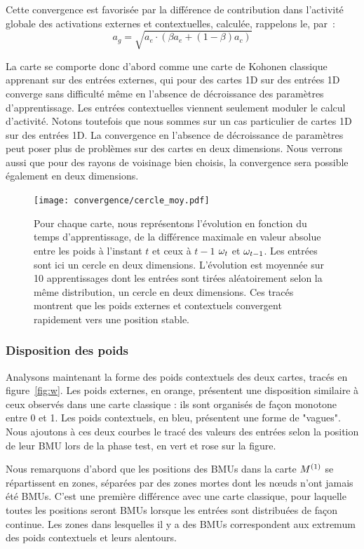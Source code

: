 \documentclass[../main]{subfiles}
\begin{document}
Cette convergence est favorisée par la différence de contribution dans l'activité globale des activations externes et contextuelles, calculée, rappelons le, par~: 
$$ a_g = \sqrt{a_e \cdot (\beta a_e + (1-\beta)a_c)}$$

La carte se comporte donc d'abord comme une carte de Kohonen classique apprenant sur des entrées externes, qui pour des cartes 1D sur des entrées 1D converge sans difficulté même en l'absence de décroissance des paramètres d'apprentissage. 
Les entrées contextuelles viennent seulement moduler le calcul d'activité.
Notons toutefois que nous sommes sur un cas particulier de cartes 1D sur des entrées 1D.
La convergence en l'absence de décroissance de paramètres peut poser plus de problèmes sur des cartes en deux dimensions. 
Nous verrons aussi que pour des rayons de voisinage bien choisis, la convergence sera possible également en deux dimensions.

\begin{figure}
	\texttt{[image: convergence/cercle\_moy.pdf]}
	\caption{Pour chaque carte, nous représentons l'évolution en fonction du temps d'apprentissage, de la différence maximale en valeur absolue entre les poids à l'instant $t$ et ceux à $t-1$ $\omega_t$ et $\omega_{t-1}$. Les entrées sont ici un cercle en deux dimensions. L'évolution est moyennée sur 10 apprentissages dont les entrées sont tirées aléatoirement selon la même distribution, un cercle en deux dimensions.
	Ces tracés montrent que les poids externes et contextuels convergent rapidement vers une position stable.\label{fig:conv}}
\end{figure}


\subsubsection{Disposition des poids}

Analysons maintenant la forme des poids contextuels des deux cartes, tracés en figure~\ref{fig:w}.
Les poids externes, en orange, présentent une disposition similaire à ceux observés dans une carte classique : ils sont organisés de façon monotone entre 0 et 1.
Les poids contextuels, en bleu, présentent une forme de "vagues". 
Nous ajoutons à ces deux courbes le tracé des valeurs des entrées selon la position de leur BMU lors de la phase test, en vert et rose sur la figure.

Nous remarquons d'abord que les positions des BMUs dans la carte $M^{({1})}$ se répartissent en zones, séparées par des zones mortes dont les n\oe{}uds n'ont jamais été BMUs.
C'est une première différence avec une carte classique, pour laquelle toutes les positions seront BMUs lorsque les entrées sont distribuées de façon continue.
Les zones dans lesquelles il y a des BMUs correspondent aux extremum des poids contextuels et leurs alentours.
\end{document}
